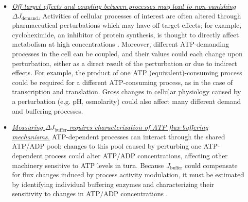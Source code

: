 \documentclass{compactarticle}
\begin{document}
\begin{itemize}
    \item \underline{\textit{Off-target effects and coupling between processes may lead to non-vanishing} $\Delta J_\text{demand}$.}
    Activities of cellular processes of interest are often altered through pharmaceutical perturbations which may have off-target effects; for example, cycloheximide, an inhibitor of protein synthesis, is thought to directly affect metabolism at high concentrations \cite{wieser2001hierarchies,ellis1970specificity}. Moreover, different ATP-demanding processes in the cell can be coupled, and their values could each change upon perturbation, either as a direct result of the perturbation or due to indirect effects. For example, the product of one ATP (equivalent)-consuming process could be required for a different ATP-consuming process, as in the case of transcription and translation. Gross changes in cellular physiology caused by a perturbation (e.g. pH, osmolarity) could also affect many different demand and buffering processes.
    
    \item \underline{\textit{Measuring} $\Delta J_\text{buffer}$ \textit{requires characterization of ATP flux-buffering mechanisms.}} ATP-dependent processes can interact through the shared ATP/ADP pool: changes to this pool caused by perturbing one ATP-dependent process could alter ATP/ADP concentrations, affecting other machinery sensitive to ATP levels in turn. Because $J_\text{buffer}$ could compensate for flux changes induced by process activity modulation, it must be estimated by identifying individual buffering enzymes and characterizing their sensitivity to changes in ATP/ADP concentrations \cite{buttgereit1995hierarchy,brown1992control}.

\end{itemize}
\end{document}
